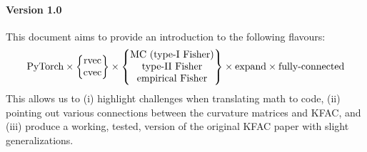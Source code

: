 \paragraph{Version 1.0} This document aims to provide an introduction to the following flavours:
\begin{align*}
  \text{PyTorch}
  \times
  \begin{Bmatrix}
    \operatorname{rvec}
    \\
    \operatorname{cvec}
  \end{Bmatrix}
  \times
  \begin{Bmatrix}
    \text{MC (type-I Fisher)}
    \\
    \text{type-II Fisher}
    \\
    \text{empirical Fisher}
  \end{Bmatrix}
  \times
  \text{expand}
  \times
  \text{fully-connected}
\end{align*}
This allows us to (i) highlight challenges when translating math to code, (ii) pointing out various connections between the curvature matrices and KFAC, and (iii) produce a working, tested, version of the original KFAC paper with slight generalizations.
